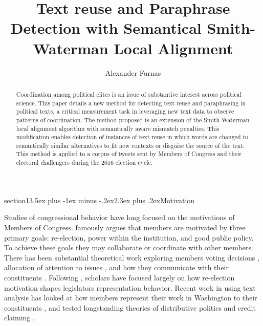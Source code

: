 \documentclass[11pt]{article}
\makeatletter
\renewcommand{\section}{\@startsection 
{section}{1}{\z@}{3.5ex plus -1ex minus -.2ex}{2.3ex plus .2ex}{\centering\normalsize\bf}}
\makeatother
\begin{document}
\title{Text reuse and Paraphrase Detection with Semantical Smith-Waterman Local Alignment}
\author{Alexander Furnas}

\date{}
\maketitle

\pagebreak  
\begin{flushleft}
\small\normalsize


\begin{abstract}%
Coordination among political elites is an issue of substantive interest across political science. This paper details a new method for detecting text reuse and paraphrasing in political texts, a critical measurement task in leveraging new text data to observe patterns of coordination. The method proposed is an extension of the Smith-Waterman local alignment algorithm with semantically aware mismatch penalties. This modification enables detection of instances of text reuse in which words are changed to semantically similar alternatives to fit new contexts or disguise the source of the text. This method is applied to a corpus of tweets sent by Members of Congress and their electoral challengers during the 2016 election cycle.%
\end{abstract}%
\pagebreak
\setlength{\parskip}{1em}
\setlength{\parindent}{4em}
\section{Motivation}

 Studies of congressional behavior have long focused on the motivations of Members of Congress. \cite{fenno1978home} famously argues that members are motivated by three primary goals: re-election, power within the institution, and good public policy. To achieve these goals they may collaborate or coordinate with other members. There has been substantial theoretical work exploring members voting decisions \citep{kingdon1977models}, allocation of attention to issues \citep{hall1998participation, hall2006lobbying}, and how they communicate with their constituents \citep{miller1963constituency, mayhew1974congress}.  Following \cite{mayhew1974congress}, scholars have focused largely on how re-election motivation shapes legislators representation behavior. Recent work in using text analysis has looked at how members represent their work in Washington to their constituents \citep{grimmer2010bayesian}, and tested longstanding theories of distributive politics and credit claiming \citep{grimmer2012words}.


\end{flushleft}
\end{document}
